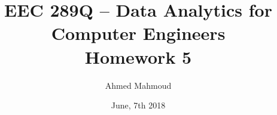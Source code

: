 \documentclass[12pt] {article}
\begin{document}
\title{EEC 289Q – Data Analytics for Computer Engineers \\ Homework 5}
\author{Ahmed Mahmoud}
\date{June, 7th 2018} 

\maketitle




\end{document}
